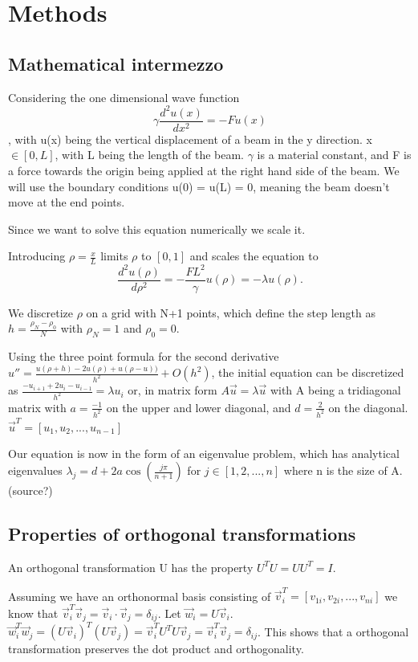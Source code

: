 \section{Methods}

\subsection*{Mathematical intermezzo}
Considering the one dimensional wave function
\begin{equation}
\gamma \frac{d^2 u(x)}{dx^2} = -F u(x)
\end{equation}
, with u(x) being the vertical displacement of a beam in the y direction.
x $\in [0, L]$, with L being the length of the beam. $\gamma$ is a material constant,
and F is a force towards the origin being applied at the right hand side of the beam.
We will use the boundary conditions u(0) = u(L) = 0, meaning the beam doesn't move
at the end points.


Since we want to solve this equation numerically we scale it.

Introducing $ \rho = \frac{x}{L} $ limits $\rho$ to $[0, 1]$ and scales the
equation to
$$\frac{d^2 u(\rho)}{d\rho^2} = - \frac{FL^2}{\gamma} u(\rho) = -\lambda u(\rho).$$

We discretize $\rho$ on a grid with N+1 points, which
define the step length as $h = \frac{\rho_N - \rho_0}{N}$ with $\rho_N = 1$ and
$\rho_0 = 0$.

Using the three point formula for the second derivative $ u'' = \frac{u(\rho + h) - 2u(\rho) +
u(\rho -u))}{h^2} + O(h^2)$, the initial equation can be discretized as
$\frac{-u_{i+1} + 2u_i - u_{i-1}}{h^2} = \lambda u_i$
or, in matrix form
$ A \vec{u} = \lambda \vec{u}$
with A being a tridiagonal matrix with $a = \frac{-1}{h^2}$ on the upper and lower
diagonal, and $d = \frac{2}{h^2}$ on the diagonal. $\vec{u}^T = [u_1, u_2, ..., u_{n-1}]$

Our equation is now in the form of an eigenvalue problem, which has analytical
eigenvalues $\lambda_j = d + 2a\cos{(\frac{j\pi}{n+1})}$ for $j \in [1,2,...,n]$
where n is the size of A. (source?)

\subsection{Properties of orthogonal transformations}

An orthogonal transformation U has the property $U^T U = U U^T = I$.

Assuming we have an orthonormal basis consisting of $\vec{v}_i^T = [v_{1i},
v_{2i}, ... , v_{ni}]$ we know that $\vec{v}_i^T \vec{v}_j = \vec{v}_i \cdot
\vec{v}_j = \delta_{ij}$. Let $\vec{w}_i = U\vec{v}_i$. $\vec{w}_i^T \vec{w}_j =
(U\vec{v}_i)^T(U\vec{v}_j) = \vec{v}_i^T U^T U \vec{v}_j = \vec{v}_i^T \vec{v}_j
= \delta_{ij}$. This shows that a orthogonal transformation preserves the dot
product and orthogonality.

